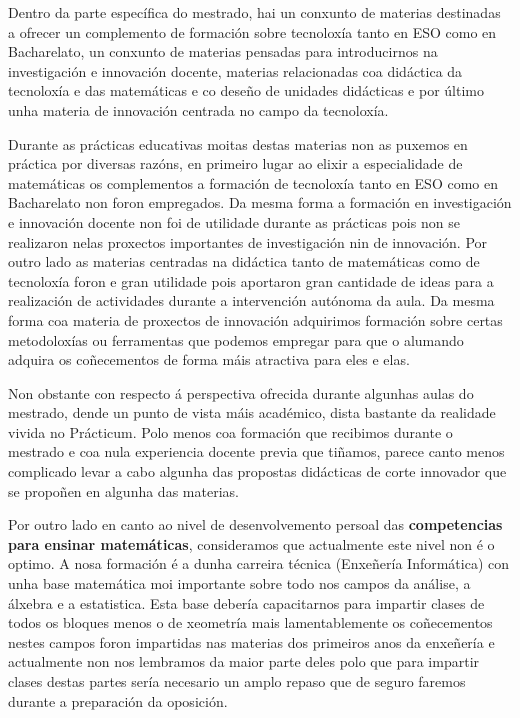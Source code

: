 Dentro da parte específica do mestrado, hai un conxunto de materias destinadas a ofrecer un complemento de formación sobre tecnoloxía tanto en ESO como en Bacharelato, un conxunto de materias pensadas para introducirnos na investigación e innovación docente, materias relacionadas coa didáctica da tecnoloxía e das matemáticas e co deseño de unidades didácticas e por último unha materia de innovación centrada no campo da tecnoloxía.

Durante as prácticas educativas moitas destas materias non as puxemos en práctica por diversas razóns, en primeiro lugar ao elixir a especialidade de matemáticas os complementos a formación de tecnoloxía tanto en ESO como en Bacharelato non foron empregados. Da mesma forma a formación en investigación e innovación docente non foi de utilidade durante as prácticas pois non se realizaron nelas proxectos importantes de investigación nin de innovación. Por outro lado as materias centradas na didáctica tanto de matemáticas como de tecnoloxía foron e gran utilidade pois aportaron gran cantidade de ideas para a realización de actividades durante a intervención autónoma da aula. Da mesma forma coa materia de proxectos de innovación adquirimos formación sobre certas metodoloxías ou ferramentas que podemos empregar para que o alumando adquira os coñecementos de forma máis atractiva para eles e elas.

Non obstante con respecto á perspectiva ofrecida durante algunhas aulas do mestrado, dende un punto de vista máis académico, dista bastante da realidade vivida no Prácticum. Polo menos coa formación que recibimos durante o mestrado e coa nula experiencia docente previa que tiñamos, parece canto menos complicado levar a cabo algunha das propostas didácticas de corte innovador que se propoñen en algunha das materias.


Por outro lado en canto ao nivel de desenvolvemento persoal das \textbf{competencias para ensinar matemáticas}, consideramos que actualmente este nivel non é o optimo. A nosa formación é a dunha carreira técnica (Enxeñería Informática) con unha base matemática moi importante sobre todo nos campos da análise, a álxebra e a estatistica. Esta base debería capacitarnos para impartir clases de todos os bloques menos o de xeometría mais lamentablemente os coñecementos nestes campos foron impartidas nas materias dos primeiros anos da enxeñería e actualmente non nos lembramos da maior parte deles polo que para impartir clases destas partes sería necesario un amplo repaso que de seguro faremos durante a preparación da oposición.
